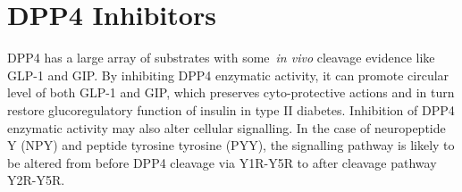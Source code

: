 \section{DPP4 Inhibitors}
DPP4 has a large array of substrates with some~\textit{in vivo} cleavage evidence like GLP-1 and GIP. By inhibiting DPP4 enzymatic activity, it can promote circular level of both GLP-1 and GIP, which preserves cyto-protective actions and in turn restore glucoregulatory function of insulin in type II diabetes. Inhibition of DPP4 enzymatic activity may also alter cellular signalling. In the case of neuropeptide Y (NPY) and peptide tyrosine tyrosine (PYY), the signalling pathway is likely to be altered from before DPP4 cleavage via Y1R-Y5R to after cleavage pathway Y2R-Y5R.~\cite{Mulvihill_2014}
